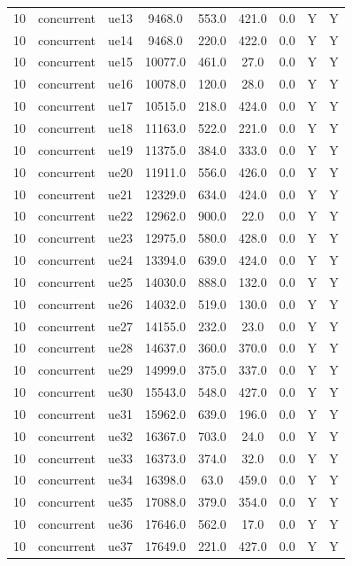 \begin{table}[ht]
\begin{tabular}{|c|c|c|c|c|c|c|c|c|}
10 & concurrent & ue13 & 9468.0 & 553.0 & 421.0 & 0.0 & Y & Y \\
10 & concurrent & ue14 & 9468.0 & 220.0 & 422.0 & 0.0 & Y & Y \\
10 & concurrent & ue15 & 10077.0 & 461.0 & 27.0 & 0.0 & Y & Y \\
10 & concurrent & ue16 & 10078.0 & 120.0 & 28.0 & 0.0 & Y & Y \\
10 & concurrent & ue17 & 10515.0 & 218.0 & 424.0 & 0.0 & Y & Y \\
10 & concurrent & ue18 & 11163.0 & 522.0 & 221.0 & 0.0 & Y & Y \\
10 & concurrent & ue19 & 11375.0 & 384.0 & 333.0 & 0.0 & Y & Y \\
10 & concurrent & ue20 & 11911.0 & 556.0 & 426.0 & 0.0 & Y & Y \\
10 & concurrent & ue21 & 12329.0 & 634.0 & 424.0 & 0.0 & Y & Y \\
10 & concurrent & ue22 & 12962.0 & 900.0 & 22.0 & 0.0 & Y & Y \\
10 & concurrent & ue23 & 12975.0 & 580.0 & 428.0 & 0.0 & Y & Y \\
10 & concurrent & ue24 & 13394.0 & 639.0 & 424.0 & 0.0 & Y & Y \\
10 & concurrent & ue25 & 14030.0 & 888.0 & 132.0 & 0.0 & Y & Y \\
10 & concurrent & ue26 & 14032.0 & 519.0 & 130.0 & 0.0 & Y & Y \\
10 & concurrent & ue27 & 14155.0 & 232.0 & 23.0 & 0.0 & Y & Y \\
10 & concurrent & ue28 & 14637.0 & 360.0 & 370.0 & 0.0 & Y & Y \\
10 & concurrent & ue29 & 14999.0 & 375.0 & 337.0 & 0.0 & Y & Y \\
10 & concurrent & ue30 & 15543.0 & 548.0 & 427.0 & 0.0 & Y & Y \\
10 & concurrent & ue31 & 15962.0 & 639.0 & 196.0 & 0.0 & Y & Y \\
10 & concurrent & ue32 & 16367.0 & 703.0 & 24.0 & 0.0 & Y & Y \\
10 & concurrent & ue33 & 16373.0 & 374.0 & 32.0 & 0.0 & Y & Y \\
10 & concurrent & ue34 & 16398.0 & 63.0 & 459.0 & 0.0 & Y & Y \\
10 & concurrent & ue35 & 17088.0 & 379.0 & 354.0 & 0.0 & Y & Y \\
10 & concurrent & ue36 & 17646.0 & 562.0 & 17.0 & 0.0 & Y & Y \\
10 & concurrent & ue37 & 17649.0 & 221.0 & 427.0 & 0.0 & Y & Y \\

\end{tabular}
\end{table}
